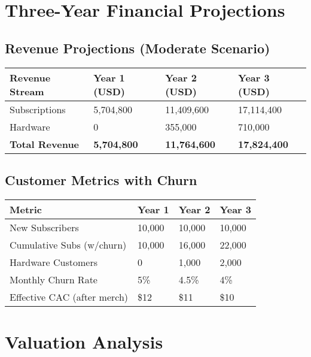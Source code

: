 \documentclass[11pt]{article}
\begin{document}
\section{Three-Year Financial Projections}

\subsection{Revenue Projections (Moderate Scenario)}
\begin{table}[H]
\centering
\begin{tabularx}{\linewidth}{l Y Y Y}
\toprule
Revenue Stream & Year 1 (USD) & Year 2 (USD) & Year 3 (USD) \\\midrule
Subscriptions & 5,704,800 & 11,409,600 & 17,114,400 \\
Hardware & 0 & 355,000 & 710,000 \\\midrule
\textbf{Total Revenue} & \textbf{5,704,800} & \textbf{11,764,600} & \textbf{17,824,400} \\
\bottomrule
\end{tabularx}
\end{table}

\subsection{Customer Metrics with Churn}
\begin{table}[H]
\centering
\begin{tabularx}{\linewidth}{l Y Y Y}
\toprule
Metric & Year 1 & Year 2 & Year 3 \\\midrule
New Subscribers & 10,000 & 10,000 & 10,000 \\
Cumulative Subs (w/churn) & 10,000 & 16,000 & 22,000 \\
Hardware Customers & 0 & 1,000 & 2,000 \\
Monthly Churn Rate & 5\% & 4.5\% & 4\% \\
Effective CAC (after merch) & \$12 & \$11 & \$10 \\
\bottomrule
\end{tabularx}
\end{table}

\section{Valuation Analysis}
\end{document}
